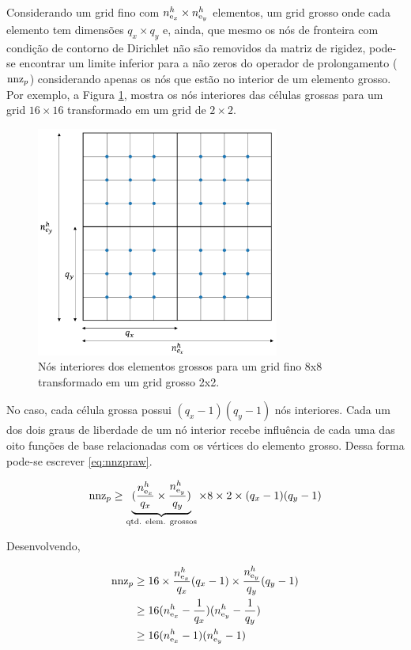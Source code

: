 Considerando um grid fino com $n_{\text{e}_x}^h \times n_{\text{e}_y}^h$ elementos, um grid grosso onde cada elemento tem dimensões $q_x \times q_y$ e, ainda, que mesmo os nós de fronteira com condição de contorno de Dirichlet não são removidos da matriz de rigidez, pode-se encontrar um limite inferior para a não zeros do operador de prolongamento ($\text{nnz}_p$) considerando apenas os nós que estão no interior de um elemento grosso. Por exemplo, a Figura \ref{fig:nosinteriores}, mostra os nós interiores das células grossas para um grid $16\times16$ transformado em um grid de $2\times2$. 

\begin{figure}[!htbp]
\centering
\includegraphics[width=8cm]{chap06/figs/nosinteriores.png}
\caption{Nós interiores dos elementos grossos para um grid fino 8x8 transformado em um grid grosso 2x2.}
\label{fig:nosinteriores}
\end{figure}

No caso, cada célula grossa possui $(q_x-1)(q_y-1)$ nós interiores. Cada um dos dois graus de liberdade de um nó interior recebe influência de cada uma das oito funções de base relacionadas com os vértices do elemento grosso. Dessa forma pode-se escrever \eqref{eq:nnzpraw}.

\begin{equation} \label{eq:nnzpraw}
    \text{nnz}_p \ge  \underbrace{(\frac{n_{\text{e}_x}^h}{q_x} \times \frac{n_{\text{e}_y}^h}{q_y})}_{\text{qtd. elem. grossos}} \times 8 \times 2 \times (q_x-1)(q_y-1)
\end{equation}

Desenvolvendo,

\begin{align}
     \text{nnz}_p   & \ge  16 \times  \frac{n_{\text{e}_x}^h}{q_x} (q_x-1) \times \frac{n_{\text{e}_y}^h}{q_y} (q_y-1) \nonumber  \\
                & \ge  16   (n_{\text{e}_x}^h - \frac{1}{q_x})  (n_{\text{e}_y}^h - \frac{1}{q_y}) \nonumber   \\
                & \ge  16   (n_{\text{e}_x}^h - 1)  (n_{\text{e}_y}^h - 1) \label{eq:nnzp}
\end{align}

